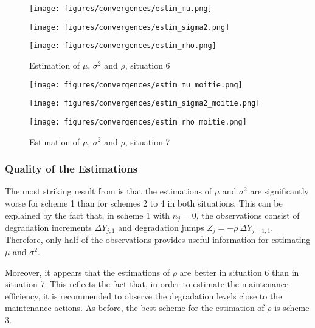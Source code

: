  
 \begin{figure}[h!]
\begin{multicols}{3}
\texttt{[image: figures/convergences/estim\_mu.png]}\\

\columnbreak

\texttt{[image: figures/convergences/estim\_sigma2.png]}\\

\columnbreak

\texttt{[image: figures/convergences/estim\_rho.png]} 
\end{multicols}
\vspace{-6mm}
\caption{Estimation of $\mu$, $\sigma^2$ and $\rho$, situation 6}
\label{fig:convergences}
\end{figure}

\begin{figure}[h!]
\begin{multicols}{3}
\texttt{[image: figures/convergences/estim\_mu\_moitie.png]}\\
\columnbreak

\texttt{[image: figures/convergences/estim\_sigma2\_moitie.png]} \\
\columnbreak

\texttt{[image: figures/convergences/estim\_rho\_moitie.png]} 
\end{multicols}
\vspace{-6mm}
\caption{Estimation of $\mu$, $\sigma^2$ and $\rho$, situation 7}
\label{fig:convergences3}
\end{figure}

\subsubsection{Quality of the Estimations}
The most striking result from  is that the estimations of $\mu$ and $\sigma^2$ are significantly worse for scheme 1 than for schemes 2 to 4 in both situations.
This can be explained by the fact that, in scheme 1 with $n_j=0$, the observations consist of degradation increments $\Delta Y_{j,1}$ and degradation jumps $Z_j=-\rho\ \Delta Y_{j-1,1} $. Therefore, only half of the observations provides useful information for estimating $\mu$ and $\sigma^2$. 

Moreover, it appears that the estimations of $\rho$ are better in situation 6 than in situation 7. This reflects the fact that, in order to estimate the maintenance efficiency, it is recommended to observe the degradation levels close to the maintenance actions. As before, the best scheme for the estimation of $\rho$ is scheme 3.

